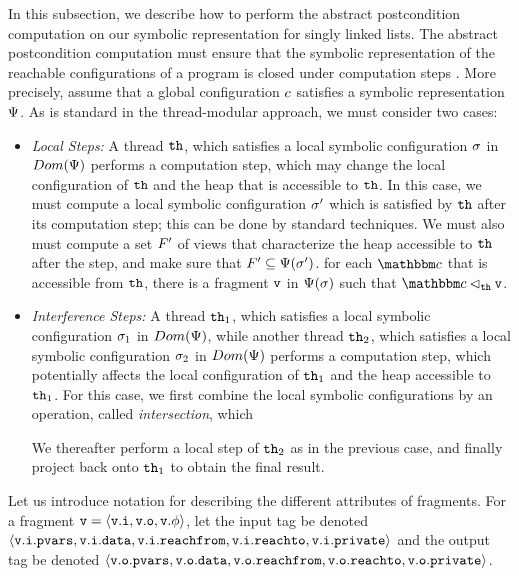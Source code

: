 In this subsection, we describe how to perform the abstract postcondition computation on our symbolic representation for singly linked lists. The
abstract postcondition computation must ensure that the symbolic representation
of the reachable configurations of a program is closed under computation
steps .
More precisely, assume that a global configuration $c$ satisfies
a symbolic representation $\Psi$. As is standard in the thread-modular
approach, we must consider two cases:
\begin{itemize}
\item
  {\it Local Steps:}
  A thread ${\tt th}$, which
  satisfies a local symbolic configuration $\sigma$
  in $Dom(\Psi)$ performs a computation step,
  which may change the local configuration of ${\tt th}$
  and the heap that is accessible to
    ${\tt th}$. In this case, we must compute
  a local symbolic configuration $\sigma'$
which is satisfied by ${\tt th}$ after its
computation step; this can be done by standard techniques. We must also
must compute a set $F'$ of views that characterize the heap accessible to
${\tt th}$ after the step, and
make sure that $F' \subseteq \Psi(\sigma')$.
for each $\cell$ that is accessible from ${\tt th}$, there is
  a fragment $\mathtt{v}$ in $\Psi(\sigma)$ such that
  $\cell \lhd_{\thread} \frag$.
\item    {\it Interference Steps:}
A thread ${\tt th}_1$, which
  satisfies a local symbolic configuration $\sigma_1$
  in $Dom(\Psi)$, while another thread ${\tt th}_2$, which
  satisfies a local symbolic configuration $\sigma_2$
  in $Dom(\Psi)$   performs a computation step,
  which potentially affects the
  local configuration of ${\tt th}_1$ and the heap accessible to ${\tt th}_1$.
  For this case, we first combine the local symbolic configurations by an
  operation, called {\em intersection}, which
We thereafter perform a local
 step of ${\tt th}_2$ as in the previous case, and finally project back onto
 ${\tt th}_1$ to obtain the final result.
\end{itemize}
Let us introduce notation for describing the different attributes of
fragments. For a fragment $\mathtt{v} = \left\langle\mathtt{v}.\mathtt{i},\mathtt{v}.\mathtt{o},\mathtt{v}.\phi\right\rangle$,
let the input tag be denoted $\left\langle\mathtt{v}.\mathtt{i}.\mathtt{pvars},\mathtt{v}.\mathtt{i}.\mathtt{data},\mathtt{v}.\mathtt{i}.\mathtt{reachfrom},\mathtt{v}.\mathtt{i}.\mathtt{reachto},\mathtt{v}.\mathtt{i}.\mathtt{private}\right\rangle$ and the output tag
be denoted $\left\langle\mathtt{v}.\mathtt{o}.\mathtt{pvars},\mathtt{v}.\mathtt{o}.\mathtt{data},\mathtt{v}.\mathtt{o}.\mathtt{reachfrom},\mathtt{v}.\mathtt{o}.\mathtt{reachto},\mathtt{v}.\mathtt{o}.\mathtt{private}\right\rangle$.

